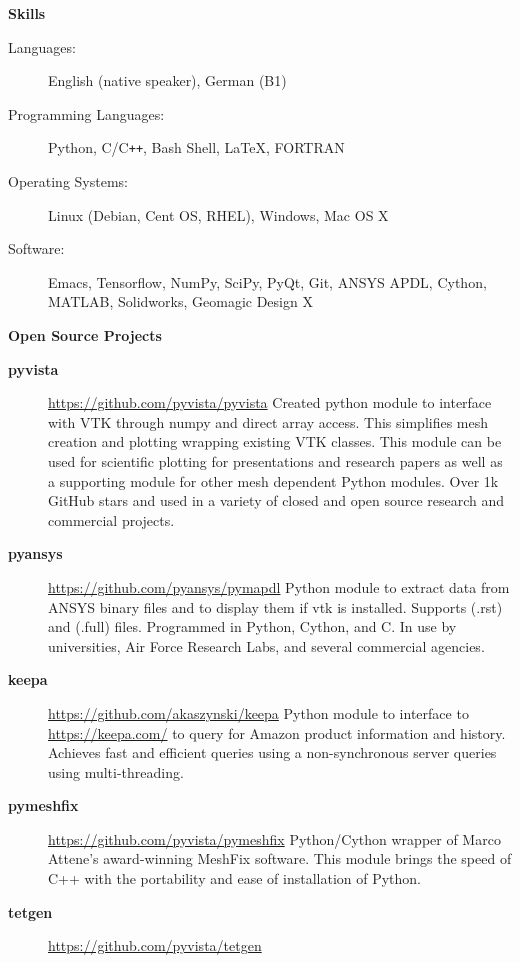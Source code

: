 \documentclass[letterpaper,11pt]{article}
\newcommand{\resheading}[1]{{\large \colorbox{mygrey}{\begin{minipage}{\textwidth}{\textbf{#1 \vphantom{p\^{E}}}}\end{minipage}}}}
\begin{document}
\resheading{Skills}

\begin{description}
\item [Languages:] English (native speaker), German (B1)
\item[Programming Languages:] Python, C/C{}\verb!++!, Bash Shell, \LaTeX, FORTRAN
\item[Operating Systems:] Linux (Debian, Cent OS, RHEL), Windows, Mac OS X
\item[Software:] Emacs, Tensorflow, NumPy, SciPy, PyQt, Git, ANSYS APDL, Cython, MATLAB, Solidworks, Geomagic Design X
\end{description}

\resheading{Open Source Projects}

\begin{description}
\item[\textbf{pyvista}] \url{https://github.com/pyvista/pyvista} \newline
  Created python module to interface with VTK through numpy and direct array access. This simplifies mesh creation and plotting wrapping existing VTK classes.  This module can be used for scientific plotting for presentations and research papers as well as a supporting module for other mesh dependent Python modules.  Over 1k GitHub stars and used in a variety of closed and open source research and commercial projects.
\item[\textbf{pyansys}] \url{https://github.com/pyansys/pymapdl} \newline
  Python module to extract data from ANSYS binary files and to display them if vtk is installed.  Supports (.rst) and (.full) files.  Programmed in Python, Cython, and C.  In use by universities, Air Force Research Labs, and several commercial agencies.
\item[\textbf{keepa}] \url{https://github.com/akaszynski/keepa} \newline
Python module to interface to \url{https://keepa.com/} to query for Amazon product information and history.  Achieves fast and efficient queries using a non-synchronous server queries using multi-threading.
\item[\textbf{pymeshfix}] \url{https://github.com/pyvista/pymeshfix} \newline
Python/Cython wrapper of Marco Attene's award-winning MeshFix software. This module brings the speed of C++ with the portability and ease of installation of Python.
\item[\textbf{tetgen}] \url{https://github.com/pyvista/tetgen} \newline

\end{description}
\end{document}
